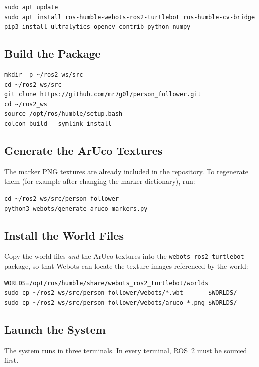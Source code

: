 \documentclass[12pt,a4paper]{article}
\begin{document}
\begin{verbatim}
sudo apt update
sudo apt install ros-humble-webots-ros2-turtlebot ros-humble-cv-bridge
pip3 install ultralytics opencv-contrib-python numpy
\end{verbatim}

\subsection{Build the Package}

\begin{verbatim}
mkdir -p ~/ros2_ws/src
cd ~/ros2_ws/src
git clone https://github.com/mr7g0l/person_follower.git
cd ~/ros2_ws
source /opt/ros/humble/setup.bash
colcon build --symlink-install
\end{verbatim}

\subsection{Generate the ArUco Textures}

The marker PNG textures are already included in the repository. To regenerate
them (for example after changing the marker dictionary), run:

\begin{verbatim}
cd ~/ros2_ws/src/person_follower
python3 webots/generate_aruco_markers.py
\end{verbatim}

\subsection{Install the World Files}

Copy the world files \emph{and} the ArUco textures into the
\texttt{webots\_ros2\_turtlebot} package, so that Webots can locate the
texture images referenced by the world:

\begin{verbatim}
WORLDS=/opt/ros/humble/share/webots_ros2_turtlebot/worlds
sudo cp ~/ros2_ws/src/person_follower/webots/*.wbt       $WORLDS/
sudo cp ~/ros2_ws/src/person_follower/webots/aruco_*.png $WORLDS/
\end{verbatim}

\subsection{Launch the System}

The system runs in three terminals. In every terminal, ROS~2 must be sourced
first.
\end{document}
